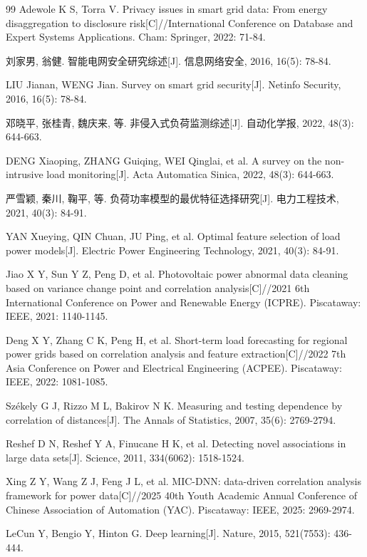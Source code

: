 \documentclass[UTF8,zihao=5,twoside]{ctexart}
\numberwithin{equation}{section}
\begin{document}
\begin{thebibliography}{99}
Adewole K S, Torra V. Privacy issues in smart grid data: From energy disaggregation to disclosure risk[C]//International Conference on Database and Expert Systems Applications. Cham: Springer, 2022: 71-84.

刘家男, 翁健. 智能电网安全研究综述[J]. 信息网络安全, 2016, 16(5): 78-84.

LIU Jianan, WENG Jian. Survey on smart grid security[J]. Netinfo Security, 2016, 16(5): 78-84.

邓晓平, 张桂青, 魏庆来, 等. 非侵入式负荷监测综述[J]. 自动化学报, 2022, 48(3): 644-663.

DENG Xiaoping, ZHANG Guiqing, WEI Qinglai, et al. A survey on the non-intrusive load monitoring[J]. Acta Automatica Sinica, 2022, 48(3): 644-663.

严雪颖, 秦川, 鞠平, 等. 负荷功率模型的最优特征选择研究[J]. 电力工程技术, 2021, 40(3): 84-91.

YAN Xueying, QIN Chuan, JU Ping, et al. Optimal feature selection of load power models[J]. Electric Power Engineering Technology, 2021, 40(3): 84-91.

Jiao X Y, Sun Y Z, Peng D, et al. Photovoltaic power abnormal data cleaning based on variance change point and correlation analysis[C]//2021 6th International Conference on Power and Renewable Energy (ICPRE). Piscataway: IEEE, 2021: 1140-1145.

Deng X Y, Zhang C K, Peng H, et al. Short-term load forecasting for regional power grids based on correlation analysis and feature extraction[C]//2022 7th Asia Conference on Power and Electrical Engineering (ACPEE). Piscataway: IEEE, 2022: 1081-1085.

Székely G J, Rizzo M L, Bakirov N K. Measuring and testing dependence by correlation of distances[J]. The Annals of Statistics, 2007, 35(6): 2769-2794.

Reshef D N, Reshef Y A, Finucane H K, et al. Detecting novel associations in large data sets[J]. Science, 2011, 334(6062): 1518-1524.

Xing Z Y, Wang Z J, Feng J L, et al. MIC-DNN: data-driven correlation analysis framework for power data[C]//2025 40th Youth Academic Annual Conference of Chinese Association of Automation (YAC). Piscataway: IEEE, 2025: 2969-2974.

LeCun Y, Bengio Y, Hinton G. Deep learning[J]. Nature, 2015, 521(7553): 436-444.


\end{thebibliography}
\end{document}
